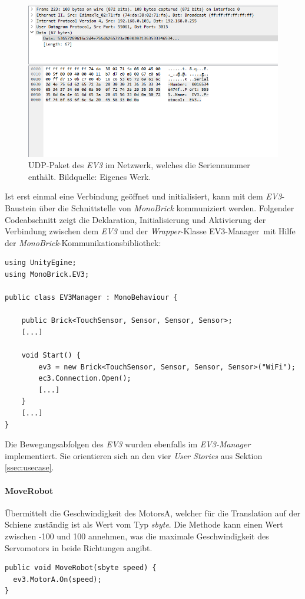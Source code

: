 \begin{figure}[H]
	\centering
	\includegraphics[width=.75\textwidth]{figuren/wireshark}
	\caption{UDP-Paket des \textit{EV3} im Netzwerk, welches die Seriennummer enthält. Bildquelle: Eigenes Werk.}
	\label{fig:wireshark}
\end{figure}
Ist erst einmal eine Verbindung geöffnet und initialisiert, kann mit dem \textit{EV3}-Baustein über die Schnittstelle von \textit{MonoBrick} kommuniziert werden.
Folgender Codeabschnitt zeigt die Deklaration, Initialisierung und Aktivierung der Verbindung zwischen dem \textit{EV3} und der \textit{Wrapper}-Klasse \frqq EV3-Manager\flqq\ mit Hilfe der \textit{MonoBrick}-Kommunikationsbibliothek:\\
\begin{lstlisting}
using UnityEgine;
using MonoBrick.EV3;

public class EV3Manager : MonoBehaviour {
	
	public Brick<TouchSensor, Sensor, Sensor, Sensor>; 
	[...]
	
	void Start() {
		ev3 = new Brick<TouchSensor, Sensor, Sensor, Sensor>("WiFi");
		ec3.Connection.Open();
		[...]
	}
	[...]
}
\end{lstlisting}
Die Bewegungsabfolgen des \textit{EV3} wurden ebenfalls im \textit{EV3-Manager} implementiert. Sie orientieren sich an den vier \textit{User Stories} aus Sektion \ref{ssec:usecase}.

\paragraph*{MoveRobot} Übermittelt die Geschwindigkeit des MotorsA, welcher für die Translation auf der Schiene zuständig ist als Wert vom Typ \textit{sbyte}. Die Methode kann einen Wert zwischen -100 und 100 annehmen, was die maximale Geschwindigkeit des Servomotors in beide Richtungen angibt.

\begin{lstlisting}
public void MoveRobot(sbyte speed) {
  ev3.MotorA.On(speed);     
}
\end{lstlisting}

